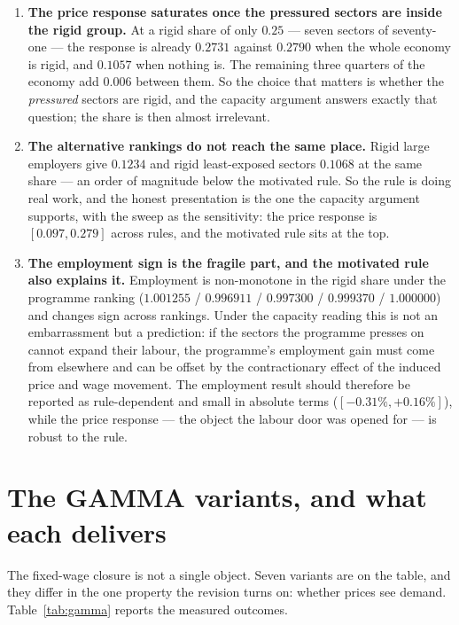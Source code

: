 \documentclass[11pt]{article}
\begin{document}
\begin{enumerate}
\item \textbf{The price response saturates once the pressured sectors are
      inside the rigid group.} At a rigid share of only $0.25$ --- seven sectors
      of seventy-one --- the response is already $0.2731$ against $0.2790$ when
      the whole economy is rigid, and $0.1057$ when nothing is. The remaining
      three quarters of the economy add $0.006$ between them. So the choice that
      matters is whether the \emph{pressured} sectors are rigid, and the
      capacity argument answers exactly that question; the share is then almost
      irrelevant.
\item \textbf{The alternative rankings do not reach the same place.} Rigid
      large employers give $0.1234$ and rigid least-exposed sectors $0.1068$ at
      the same share --- an order of magnitude below the motivated rule. So the
      rule is doing real work, and the honest presentation is the one the
      capacity argument supports, with the sweep as the sensitivity: the price
      response is $[0.097, 0.279]$ across rules, and the motivated rule sits at
      the top.
\item \textbf{The employment sign is the fragile part, and the motivated rule
      also explains it.} Employment is non-monotone in the rigid share under the
      programme ranking ($1.001255$ / $0.996911$ / $0.997300$ / $0.999370$ /
      $1.000000$) and changes sign across rankings. Under the capacity reading
      this is not an embarrassment but a prediction: if the sectors the
      programme presses on cannot expand their labour, the programme's
      employment gain must come from elsewhere and can be offset by the
      contractionary effect of the induced price and wage movement. The
      employment result should therefore be reported as rule-dependent and
      small in absolute terms ($[-0.31\%, +0.16\%]$), while the price response
      --- the object the labour door was opened for --- is robust to the rule.
\end{enumerate}

\section{The GAMMA variants, and what each delivers}\label{sec:gammas}

The fixed-wage closure is not a single object. Seven variants are on the table,
and they differ in the one property the revision turns on: whether prices see
demand. Table~\ref{tab:gamma} reports the measured outcomes.
\end{document}
